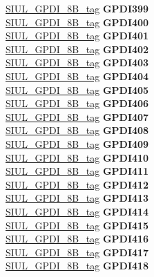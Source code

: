 \begin{DoxyCompactItemize}
\begin{tabbing}
\>\>\mbox{\hyperlink{unionSIUL__GPDI__8B__tag}{SIUL\_GPDI\_8B\_tag}} {\bfseries GPDI399}\\
\>\>\mbox{\hyperlink{unionSIUL__GPDI__8B__tag}{SIUL\_GPDI\_8B\_tag}} {\bfseries GPDI400}\\
\>\>\mbox{\hyperlink{unionSIUL__GPDI__8B__tag}{SIUL\_GPDI\_8B\_tag}} {\bfseries GPDI401}\\
\>\>\mbox{\hyperlink{unionSIUL__GPDI__8B__tag}{SIUL\_GPDI\_8B\_tag}} {\bfseries GPDI402}\\
\>\>\mbox{\hyperlink{unionSIUL__GPDI__8B__tag}{SIUL\_GPDI\_8B\_tag}} {\bfseries GPDI403}\\
\>\>\mbox{\hyperlink{unionSIUL__GPDI__8B__tag}{SIUL\_GPDI\_8B\_tag}} {\bfseries GPDI404}\\
\>\>\mbox{\hyperlink{unionSIUL__GPDI__8B__tag}{SIUL\_GPDI\_8B\_tag}} {\bfseries GPDI405}\\
\>\>\mbox{\hyperlink{unionSIUL__GPDI__8B__tag}{SIUL\_GPDI\_8B\_tag}} {\bfseries GPDI406}\\
\>\>\mbox{\hyperlink{unionSIUL__GPDI__8B__tag}{SIUL\_GPDI\_8B\_tag}} {\bfseries GPDI407}\\
\>\>\mbox{\hyperlink{unionSIUL__GPDI__8B__tag}{SIUL\_GPDI\_8B\_tag}} {\bfseries GPDI408}\\
\>\>\mbox{\hyperlink{unionSIUL__GPDI__8B__tag}{SIUL\_GPDI\_8B\_tag}} {\bfseries GPDI409}\\
\>\>\mbox{\hyperlink{unionSIUL__GPDI__8B__tag}{SIUL\_GPDI\_8B\_tag}} {\bfseries GPDI410}\\
\>\>\mbox{\hyperlink{unionSIUL__GPDI__8B__tag}{SIUL\_GPDI\_8B\_tag}} {\bfseries GPDI411}\\
\>\>\mbox{\hyperlink{unionSIUL__GPDI__8B__tag}{SIUL\_GPDI\_8B\_tag}} {\bfseries GPDI412}\\
\>\>\mbox{\hyperlink{unionSIUL__GPDI__8B__tag}{SIUL\_GPDI\_8B\_tag}} {\bfseries GPDI413}\\
\>\>\mbox{\hyperlink{unionSIUL__GPDI__8B__tag}{SIUL\_GPDI\_8B\_tag}} {\bfseries GPDI414}\\
\>\>\mbox{\hyperlink{unionSIUL__GPDI__8B__tag}{SIUL\_GPDI\_8B\_tag}} {\bfseries GPDI415}\\
\>\>\mbox{\hyperlink{unionSIUL__GPDI__8B__tag}{SIUL\_GPDI\_8B\_tag}} {\bfseries GPDI416}\\
\>\>\mbox{\hyperlink{unionSIUL__GPDI__8B__tag}{SIUL\_GPDI\_8B\_tag}} {\bfseries GPDI417}\\
\>\>\mbox{\hyperlink{unionSIUL__GPDI__8B__tag}{SIUL\_GPDI\_8B\_tag}} {\bfseries GPDI418}\\

\end{tabbing}
\end{DoxyCompactItemize}

